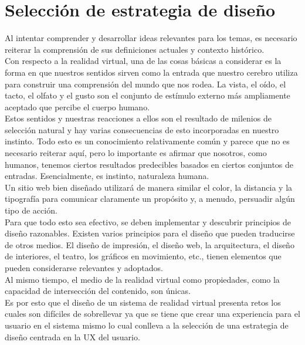 \section{Selección de estrategia de diseño}
Al intentar comprender y desarrollar ideas relevantes para los temas, es necesario reiterar la comprensión de sus definiciones actuales y contexto histórico.\\
Con respecto a la realidad virtual, una de las cosas básicas a considerar es la forma en que nuestros sentidos sirven como la entrada que nuestro cerebro utiliza 
para construir una comprensión del mundo que nos rodea. La vista, el oído, el tacto, el olfato y el gusto son el conjunto de estímulo externo más ampliamente aceptado 
que percibe el cuerpo humano.\\
Estos sentidos y nuestras reacciones a ellos son el resultado de milenios de selección natural y hay varias consecuencias de esto incorporadas en nuestro instinto. 
Todo esto es un conocimiento relativamente común y parece que no es necesario reiterar aquí, pero lo importante es afirmar que nosotros, como humanos, tenemos ciertos 
resultados predecibles basados en ciertos conjuntos de entradas. Esencialmente, es instinto, naturaleza humana.\\
Un sitio web bien diseñado utilizará de manera similar el color, la distancia y la tipografía para comunicar claramente un propósito y, a menudo, persuadir algún tipo de acción.\\
Para que todo esto sea efectivo, se deben implementar y descubrir principios de diseño razonables. Existen varios principios para el diseño que pueden traducirse de otros medios. 
El diseño de impresión, el diseño web, la arquitectura, el diseño de interiores, el teatro, los gráficos en movimiento, etc., tienen elementos que pueden considerarse 
relevantes y adoptados. \cite{web18} \\
Al mismo tiempo, el medio de la realidad virtual como propiedades, como la capacidad de intersección del contenido, son únicas.\\
Es por esto que el diseño de un sistema de realidad virtual presenta retos los cuales son difíciles de sobrellevar ya que se tiene que crear una experiencia para el 
usuario en el sistema mismo lo cual conlleva a la selección de una estrategia de diseño centrada en la UX del usuario.


